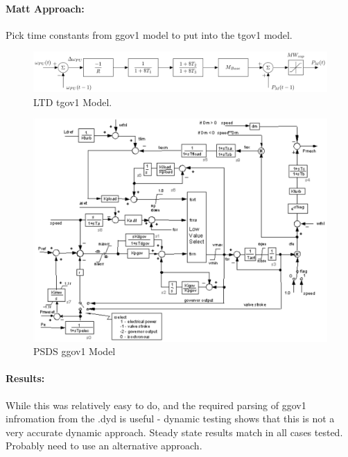 \documentclass[12pt]{article}
\begin{document}
\paragraph{Matt Approach:} Pick time constants from ggov1 model to put into the tgov1 model.

	\begin{figure}[h!]
			\centering
			\includegraphics[width=\linewidth]{tgov1}\vspace{-1em}
			\caption{LTD tgov1 Model.}
			\label{tgov1}		 
	\end{figure}\vspace{-1em}

	\begin{figure}[h!]
				\centering
				\includegraphics[width=\linewidth]{psds_ggox1}  \vspace{-2em}
				\caption{PSDS ggov1 Model} 
				\label{ggov1}
	\end{figure}\vspace{-2em}

\paragraph{Results:} While this was relatively easy to do, and the required parsing of ggov1 infromation from the .dyd is useful - dynamic testing shows that this is not a very accurate dynamic approach. Steady state results match in all cases tested. Probably need to use an alternative approach.
\end{document}
